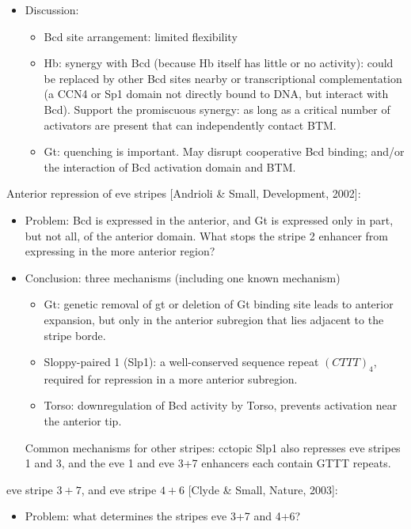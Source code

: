 \documentclass{report}
\begin{document}
\begin{enumerate}
\begin{itemize}
		\item Discussion:
		\begin{itemize}
			\item Bcd site arrangement: limited flexibility
			\item Hb: synergy with Bcd (because Hb itself has little or no activity): could be replaced by other Bcd sites nearby or transcriptional complementation (a CCN4 or Sp1 domain not directly bound to DNA, but interact with Bcd). Support the promiscuous synergy: as long as a critical number of activators are present that can independently contact BTM. 
			\item Gt: quenching is important. May disrupt cooperative Bcd binding; and/or the interaction of Bcd activation domain and BTM. 
		\end{itemize}
	\end{itemize}
	
	Anterior repression of eve stripes [Andrioli \& Small, Development, 2002]:
	\begin{itemize}
		\item Problem: Bcd is expressed in the anterior, and Gt is expressed only in part, but not all, of the anterior domain. What stops the stripe 2 enhancer from expressing in the more anterior region? 
		
		\item Conclusion: three mechanisms (including one known mechanism)
		\begin{itemize}
			\item Gt: genetic removal of gt or deletion of Gt binding site leads to anterior expansion, but only in the anterior subregion that lies adjacent to the stripe borde. 
			\item Sloppy-paired 1 (Slp1): a well-conserved sequence repeat $(CTTT)_4$, required for repression in a more anterior subregion. 
			\item Torso: downregulation of Bcd activity by Torso, prevents activation near the anterior tip. 
		\end{itemize}
		Common mechanisms for other stripes: cctopic Slp1 also represses eve stripes 1 and 3, and the eve 1 and eve 3+7 enhancers each contain GTTT repeats. 
	\end{itemize}
	
	eve stripe $3 + 7$, and eve stripe $4 + 6$ [Clyde \& Small, Nature, 2003]:
	\begin{itemize}
		\item Problem: what determines the stripes eve 3+7 and 4+6? 
		

\end{itemize}
\end{enumerate}
\end{document}
